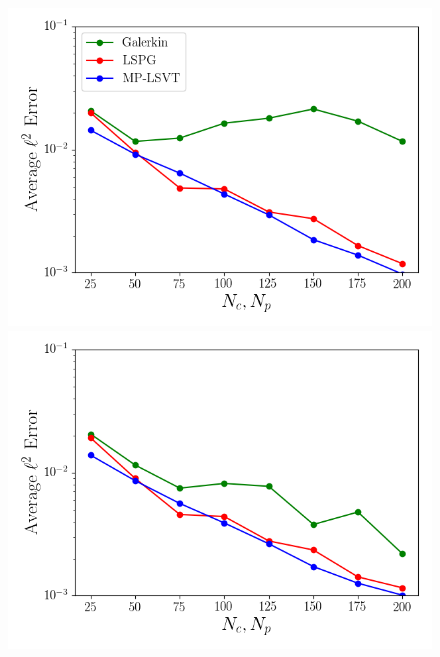 \begin{figure}
	\begin{minipage}{0.49\linewidth}
		\includegraphics[width=0.99\linewidth]{Chapters/CavityAndCVRC/Images/cavity/unsampled/unsampled_dt1e-6_Average_errorRaw.png}
		\subcaption{$\dt = \dtFOM$}
	\end{minipage}
	\begin{minipage}{0.49\linewidth}
		\includegraphics[width=0.99\linewidth]{Chapters/CavityAndCVRC/Images/cavity/unsampled/unsampled_dt2p5e-6_Average_errorRaw.png}
		\subcaption{$\dt = 2.5 \times \dtFOM$}
	\end{minipage}


\end{figure}
